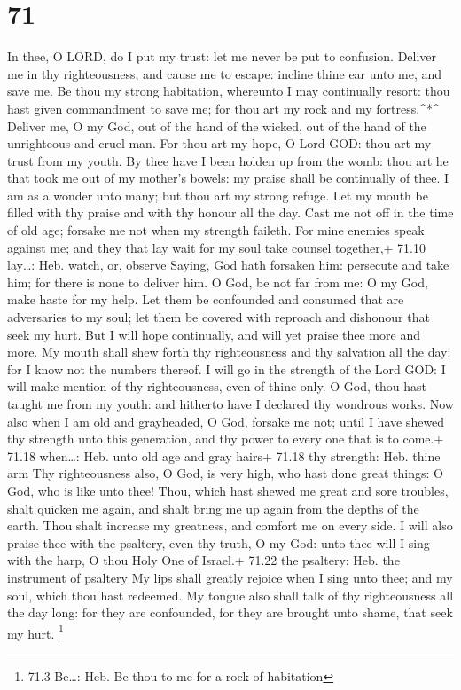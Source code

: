 \hypertarget{section-70}{%
\section{71}\label{section-70}}

 In thee, O LORD, do I put my trust: let me never be put to
confusion.  Deliver me in thy righteousness, and cause me to
escape: incline thine ear unto me, and save me.  Be thou my
strong habitation, whereunto I may continually resort: thou hast given
commandment to save me; for thou art my rock and my fortress.\^{}*\^{}
 Deliver me, O my God, out of the hand of the wicked, out of
the hand of the unrighteous and cruel man.  For thou art my
hope, O Lord GOD: thou art my trust from my youth.  By thee
have I been holden up from the womb: thou art he that took me out of my
mother's bowels: my praise shall be continually of thee.  I
am as a wonder unto many; but thou art my strong refuge. 
Let my mouth be filled with thy praise and with thy honour all the day.
 Cast me not off in the time of old age; forsake me not when
my strength faileth.  For mine enemies speak against me;
and they that lay wait for my soul take counsel together,+ 71.10
lay\ldots: Heb. watch, or, observe  Saying, God hath
forsaken him: persecute and take him; for there is none to deliver him.
 O God, be not far from me: O my God, make haste for my
help.  Let them be confounded and consumed that are
adversaries to my soul; let them be covered with reproach and dishonour
that seek my hurt.  But I will hope continually, and will
yet praise thee more and more.  My mouth shall shew forth
thy righteousness and thy salvation all the day; for I know not the
numbers thereof.  I will go in the strength of the Lord
GOD: I will make mention of thy righteousness, even of thine only.
 O God, thou hast taught me from my youth: and hitherto
have I declared thy wondrous works.  Now also when I am old
and grayheaded, O God, forsake me not; until I have shewed thy strength
unto this generation, and thy power to every one that is to come.+ 71.18
when\ldots: Heb. unto old age and gray hairs+ 71.18 thy strength: Heb.
thine arm  Thy righteousness also, O God, is very high, who
hast done great things: O God, who is like unto thee! 
Thou, which hast shewed me great and sore troubles, shalt quicken me
again, and shalt bring me up again from the depths of the earth.
 Thou shalt increase my greatness, and comfort me on every
side.  I will also praise thee with the psaltery, even thy
truth, O my God: unto thee will I sing with the harp, O thou Holy One of
Israel.+ 71.22 the psaltery: Heb. the instrument of psaltery
 My lips shall greatly rejoice when I sing unto thee; and
my soul, which thou hast redeemed.  My tongue also shall
talk of thy righteousness all the day long: for they are confounded, for
they are brought unto shame, that seek my hurt. \footnote{71.3 Be\ldots:
  Heb. Be thou to me for a rock of habitation}

